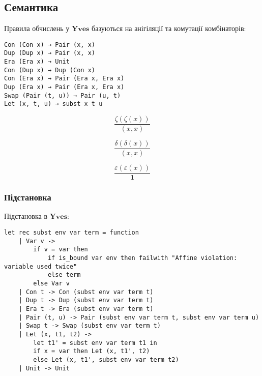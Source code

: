 \documentclass{article}
\begin{document}
\subsection{Семантика}

\begin{theorem}
Правила обчислень у $\mathbf{Yves}$ базуються на анігіляції та комутації комбінаторів:
\begin{lstlisting}[mathescape=true]
Con (Con x) → Pair (x, x)
Dup (Dup x) → Pair (x, x)
Era (Era x) → Unit
Con (Dup x) → Dup (Con x)
Con (Era x) → Pair (Era x, Era x)
Dup (Era x) → Pair (Era x, Era x)
Swap (Pair (t, u)) → Pair (u, t)
Let (x, t, u) → subst x t u
\end{lstlisting}
\end{theorem}

\begin{equation}
\tag{$\zeta$-annihilation}
\dfrac
{\zeta (\zeta (x))}
{(x, x)}
\end{equation}

\begin{equation}
\tag{$\delta$-annihilation}
\dfrac
{\delta (\delta (x))}
{(x, x)}
\end{equation}

\begin{equation}
\tag{$\epsilon$-annihilation}
\dfrac
{\varepsilon (\varepsilon (x))}
{\mathbf{1}}
\end{equation}

\subsubsection{Підстановка}

\begin{definition}
Підстановка в $\mathbf{Yves}$:
\begin{lstlisting}[mathescape=true]
let rec subst env var term = function
    | Var v ->
        if v = var then
            if is_bound var env then failwith "Affine violation: variable used twice"
            else term
        else Var v
    | Con t -> Con (subst env var term t)
    | Dup t -> Dup (subst env var term t)
    | Era t -> Era (subst env var term t)
    | Pair (t, u) -> Pair (subst env var term t, subst env var term u)
    | Swap t -> Swap (subst env var term t)
    | Let (x, t1, t2) ->
        let t1' = subst env var term t1 in
        if x = var then Let (x, t1', t2)
        else Let (x, t1', subst env var term t2)
    | Unit -> Unit
\end{lstlisting}
\end{definition}
\end{document}
